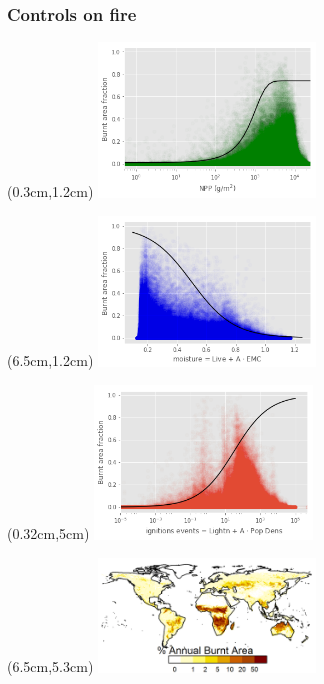 \begin{frame}
	\frametitle{Controls on fire}
	\begin{textblock*}{14cm}(0.3cm,1.2cm)
		\includegraphics[width=5.78cm]{images/limitCurves/NPPVsFire}	
	\end{textblock*}
	\begin{textblock*}{14cm}(6.5cm,1.2cm)
		\includegraphics[width=5.78cm]{images/limitCurves/alphaVsFire}	
	\end{textblock*}
	\begin{textblock*}{14cm}(0.32cm,5cm)
		\includegraphics[width=5.78cm]{images/limitCurves/ignitionsVsFire.png}		
	\end{textblock*}
	\begin{textblock*}{14cm}(6.5cm,5.3cm)
		\includegraphics[width=5.78cm]{images/limitCurves/fireMap.png}		
	\end{textblock*}
\end{frame}


